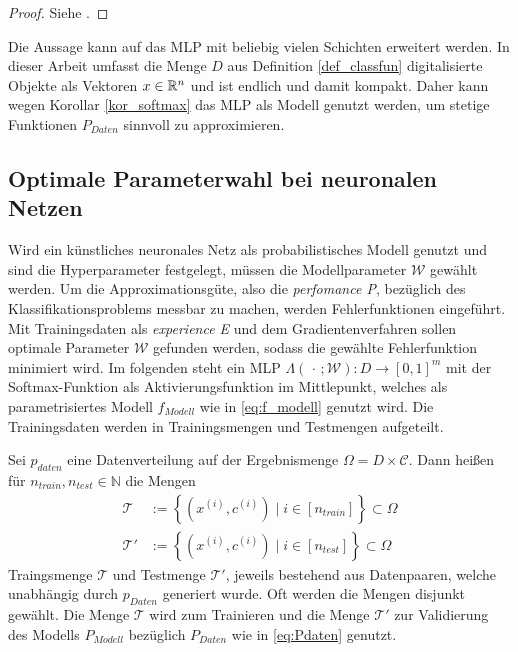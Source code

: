 \begin{proof}
    Siehe \cite{strauss}.
\end{proof}

Die Aussage kann auf das MLP mit beliebig vielen Schichten erweitert werden.
In dieser Arbeit umfasst die Menge $D$ aus Definition \ref{def_classfun} digitalisierte Objekte als Vektoren $x \in \mathbb{R}^n$ und ist endlich und damit kompakt. Daher kann wegen Korollar \ref{kor_softmax} das MLP als Modell genutzt werden, um stetige Funktionen $P_{Daten}$ sinnvoll zu approximieren.

\subsection{Optimale Parameterwahl bei neuronalen Netzen}

Wird ein künstliches neuronales Netz als probabilistisches Modell genutzt und sind die Hyperparameter festgelegt, müssen die Modellparameter $\mathcal{W}$ gewählt werden. Um die Approximationsgüte, also die \textit{perfomance P}, bezüglich des Klassifikationsproblems messbar zu machen, werden Fehlerfunktionen eingeführt. 
Mit Trainingsdaten als \textit{experience E} und dem Gradientenverfahren\cite{nocedal1999numerical} sollen optimale Parameter $\mathcal{W}$ gefunden werden, sodass die gewählte Fehlerfunktion minimiert wird. Im folgenden steht ein MLP $\Lambda(\, \cdot \, ; \mathcal{W}): D \rightarrow [0,1]^m$  mit der Softmax-Funktion als Aktivierungsfunktion im Mittlepunkt, welches als parametrisiertes Modell $f_{Modell}$ wie in \ref{eq:f_modell} genutzt wird.
Die Trainingsdaten werden in Trainingsmengen und Testmengen aufgeteilt.

\begin{defi}
    Sei $p_{daten}$ eine Datenverteilung auf der Ergebnismenge $\Omega=D \times \mathcal{C}$. Dann heißen für $n_{train}, n_{test} \in \mathbb{N}$ die Mengen
    \begin{align*}
        \mathcal{T} &:= \left\{ (x^{(i)},c^{(i)}) \; | \; i \in [n_{train}] \right\} \subset \Omega \\
        \mathcal{T}' &:= \left\{ (x^{(i)},c^{(i)}) \; | \; i \in [n_{test}] \right\} \subset \Omega
    \end{align*}
    Traingsmenge $\mathcal{T}$ und Testmenge $\mathcal{T}'$, jeweils bestehend aus Datenpaaren, welche unabhängig durch $p_{Daten}$ generiert wurde. Oft werden die Mengen disjunkt gewählt. Die Menge $\mathcal{T}$ wird zum Trainieren und die Menge $\mathcal{T}'$ zur Validierung des Modells $P_{Modell}$ bezüglich $P_{Daten}$ wie in \ref{eq:Pdaten} genutzt.
\end{defi}

